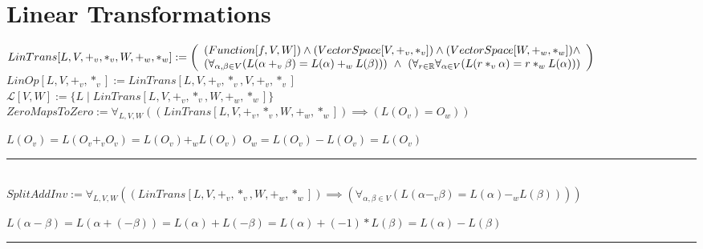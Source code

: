 \documentclass{book}
\newcommand{\abr}{:=}
\newcommand{\st}{\mathbin{|}}
\begin{document}
\section{Linear Transformations}
$LinTrans[L, V, +_v, *_v, W, +_w, *_w] \abr \left(\begin{array}{ll}
  (Function[f, V, W]) \hfill \land \hfill (VectorSpace[V, +_v, *_v]) \hfill \land \hfill (VectorSpace[W, +_w, *_w]) \hfill \land \hfill \\
  (\forall_{\alpha, \beta \in V}(L(\alpha +_v \beta) = L(\alpha) +_w L(\beta))) \hfill \land \hfill (\forall_{r \in \mathbb{R}} \forall_{\alpha \in V}(L(r *_v \alpha) = r *_w L(\alpha)))
\end{array}\right)$ \\
$LinOp[L, V, +_v, *_v] \abr LinTrans[L, V, +_v, *_v, V, +_v, *_v]$ \\
$\mathcal{L}[V, W] \abr \{L \st LinTrans[L, V, +_v, *_v, W, +_w, *_w]\}$ \\

$ZeroMapsToZero \abr \forall_{L, V, W}((LinTrans[L, V, +_v, *_v, W, +_w, *_w]) \implies (L(O_v) = O_w))$
\begin{enumerate}
  \lit $L(O_v) = L(O_v +_v O_v) = L(O_v) +_w L(O_v)$
  \lit $O_w = L(O_v) - L(O_v) = L(O_v)$
\end{enumerate} \vspace{.75mm} \hrule \vspace{.75mm} \ \\ 

$SplitAddInv \abr \forall_{L, V, W}((LinTrans[L, V, +_v, *_v, W, +_w, *_w]) \implies (\forall_{\alpha, \beta \in V}(L(\alpha -_v \beta) = L(\alpha) -_w L(\beta))))$
\begin{enumerate}
  \lit $L(\alpha - \beta) = L(\alpha + (-\beta)) = L(\alpha) + L(-\beta) = L(\alpha) + (-1) * L(\beta) = L(\alpha) - L(\beta)$
\end{enumerate} \vspace{.75mm} \hrule \vspace{.75mm} \ \\ 
\end{document}
